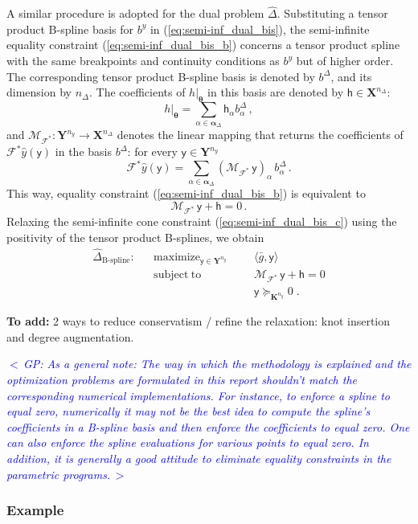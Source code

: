 \documentclass{article}
\DeclareMathOperator*{\maximize}{maximize}
\DeclareMathOperator*{\subj}{subject\;to}
\newcommand{\commentGP}[1]{\noindent \textcolor{blue}{\emph{$<\,$GP: #1$\,>$}}}%
\newcommand{\adj}{\ast}                     %
\newcommand{\Ppar}{{\bm{\theta}}}                   %
\newcommand{\X}{\mathbf{X}}                         %
\newcommand{\Y}{\mathbf{Y}}                         %
\newcommand{\K}{\mathbf{K}}                         %
\newcommand{\calF}{\mathcal{F}}                     %
\newcommand{\by}{b^y}               %
\newcommand{\cy}{\textsf{y}}        %
\newcommand{\ny}{{n_y}}             %
\newcommand{\Alpha}{\bm{\alpha}}    %
\newcommand{\meang}{\bar{g}}        %
\newcommand{\bDelta}{b^\Delta}          %
\newcommand{\bDeltaa}{b^\Delta_\alpha}  %
\newcommand{\nDelta}{{n_\Delta}}        %
\newcommand{\ch}{\textsf{h}}            %
\newcommand{\cha}{\textsf{h}_\alpha}    %
\newcommand{\calMFadj}{\mathcal{M}_{\mathcal{F}^\adj}}
\begin{document}
A similar procedure is adopted for the dual problem $\hat{\Delta}$. Substituting a tensor product B-spline basis for $\by$ in (\ref{eq:semi-inf_dual_bis}), the semi-infinite equality constraint (\ref{eq:semi-inf_dual_bis_b}) concerns a tensor product spline with the same breakpoints and continuity conditions as $\by$ but of higher order. The corresponding tensor product B-spline basis is denoted by $\bDelta$, and its dimension by $\nDelta$. The coefficients of $h|_\Ppar$ in this basis are denoted by $\ch\in\X^\nDelta$:
\[ h|_\Ppar = \sum_{\alpha\in\Alpha_\Delta} \cha \bDeltaa \,,%
\]
and $\calMFadj:\Y^\ny \rightarrow \X^\nDelta$ denotes the linear mapping that returns the coefficients of $\calF^\adj\hat{y}(\cy)$ in the basis $\bDelta$: for every $\cy\in\Y^\ny$
\[ \calF^\adj \hat{y}(\cy) = \sum_{\alpha\in\Alpha_\Delta} (\calMFadj \, \cy)_\alpha \, \bDeltaa\,. %
\]
This way, equality constraint (\ref{eq:semi-inf_dual_bis_b}) is equivalent to
\[ \calMFadj\,\cy + \ch = 0 \,.
\]
Relaxing the semi-infinite cone constraint (\ref{eq:semi-inf_dual_bis_c}) using the positivity of the tensor product B-splines, we obtain
\[\begin{aligned}
\hat{\Delta}_{\text{B-spline}}: && \maximize_{\cy\in\Y^\ny} &&& \langle \meang, \cy \rangle \\%
                                && \subj                    &&& \calMFadj\,\cy + \ch = 0 \\%
                                &&                          &&& \cy \succeq_{\K^\ny} 0     \;.%
\end{aligned}\]

\noindent \textbf{To add:} 2 ways to reduce conservatism / refine the relaxation: knot insertion and degree augmentation.

\commentGP{As a general note: The way in which the methodology is explained and the optimization problems are formulated in this report shouldn't match the corresponding numerical implementations. For instance, to enforce a spline to equal zero, numerically it may not be the best idea to compute the spline's coefficients in a B-spline basis and then enforce the coefficients to equal zero. One can also enforce the spline evaluations for various points to equal zero. In addition, it is generally a good attitude to eliminate equality constraints in the parametric programs.}


\subsubsection{Example}
\end{document}
